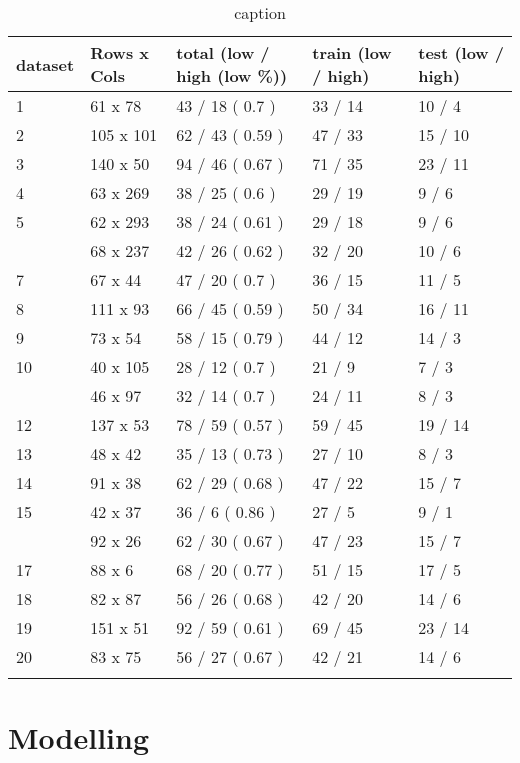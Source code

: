 \begin{table}
    \begin{tabularx}{\textwidth}{XXXXX}
\toprule{}
dataset & Rows x Cols & total (low / high (low \%)) & train (low / high) & test (low / high)\\
\midrule{}
1 & 61 x 78 & 43 / 18 ( 0.7 ) & 33 / 14 & 10 / 4\\
2 & 105 x 101 & 62 / 43 ( 0.59 ) & 47 / 33 & 15 / 10\\
3 & 140 x 50 & 94 / 46 ( 0.67 ) & 71 / 35 & 23 / 11\\
4 & 63 x 269 & 38 / 25 ( 0.6 ) & 29 / 19 & 9 / 6\\
5 & 62 x 293 & 38 / 24 ( 0.61 ) & 29 / 18 & 9 / 6\\
\addlinespace
6 & 68 x 237 & 42 / 26 ( 0.62 ) & 32 / 20 & 10 / 6\\
7 & 67 x 44 & 47 / 20 ( 0.7 ) & 36 / 15 & 11 / 5\\
8 & 111 x 93 & 66 / 45 ( 0.59 ) & 50 / 34 & 16 / 11\\
9 & 73 x 54 & 58 / 15 ( 0.79 ) & 44 / 12 & 14 / 3\\
10 & 40 x 105 & 28 / 12 ( 0.7 ) & 21 / 9 & 7 / 3\\
\addlinespace
11 & 46 x 97 & 32 / 14 ( 0.7 ) & 24 / 11 & 8 / 3\\
12 & 137 x 53 & 78 / 59 ( 0.57 ) & 59 / 45 & 19 / 14\\
13 & 48 x 42 & 35 / 13 ( 0.73 ) & 27 / 10 & 8 / 3\\
14 & 91 x 38 & 62 / 29 ( 0.68 ) & 47 / 22 & 15 / 7\\
15 & 42 x 37 & 36 / 6 ( 0.86 ) & 27 / 5 & 9 / 1\\
\addlinespace
16 & 92 x 26 & 62 / 30 ( 0.67 ) & 47 / 23 & 15 / 7\\
17 & 88 x 6 & 68 / 20 ( 0.77 ) & 51 / 15 & 17 / 5\\
18 & 82 x 87 & 56 / 26 ( 0.68 ) & 42 / 20 & 14 / 6\\
19 & 151 x 51 & 92 / 59 ( 0.61 ) & 69 / 45 & 23 / 14\\
20 & 83 x 75 & 56 / 27 ( 0.67 ) & 42 / 21 & 14 / 6\\
\bottomrule{}
\end{tabularx}
    \caption{caption}\label{tbl:mulsetDatasets}
\end{table}


\section{Modelling}


